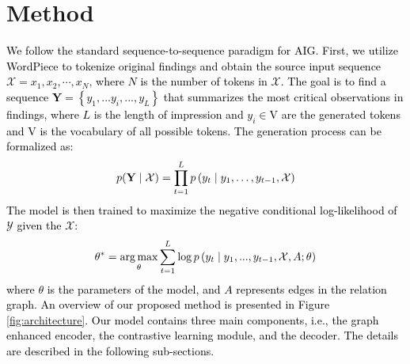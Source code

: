\documentclass[11pt]{article}
\begin{document}
\section{Method}
\textcolor{black}{
We follow the standard sequence-to-sequence paradigm for AIG. First, we utilize WordPiece \cite{wu2016google} to tokenize original findings and obtain the source input sequence $\mathcal{X} = x_{1},x_{2},\cdots, x_{N}$, where $N$ is the number of tokens in $\mathcal{X}$.
The goal is to find a sequence $\mathbf{Y}=\left\{y_{1},...y_{i},..., y_{L}\right\}$ that summarizes the most critical observations in findings, where $L$ is the length of impression and $y_{i} \in \mathrm{V}$ are the generated tokens and $\mathrm{V}$ is the vocabulary of all possible tokens.
%
The generation process can be formalized as:
\begin{equation}
\setlength\abovedisplayskip{6pt}
\setlength\belowdisplayskip{6pt}
    p(\mathbf{Y} \mid \mathcal{X})=\prod_{t=1}^{L} p\left(y_{t} \mid y_{1}, \ldots, y_{t-1}, \mathcal{X}\right)    
\end{equation}
%
The model is then trained to maximize the negative conditional log-likelihood of $\mathcal{Y}$ given the $\mathcal{X}$:
%
\begin{equation}
\setlength\abovedisplayskip{6pt}
\setlength\belowdisplayskip{6pt}
    \theta^{*}=\underset{\theta}{\arg \max}  \sum_{t=1}^{L} \log p\left(y_{t} \mid y_{1}, ...,  y_{t-1}, \mathcal{X}, A;\theta\right)
\end{equation}
%
where $\theta$ is the parameters of the model, and $A$ represents edges in the relation graph.
%
An overview of our proposed method is presented in Figure \ref{fig:architecture}.
%
Our model contains three main components, i.e., the graph enhanced encoder, the contrastive learning module, and the decoder. The details are described in the following sub-sections.
}
\end{document}
